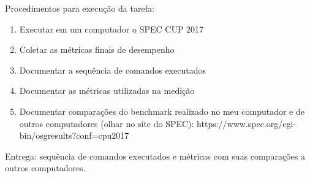 




Procedimentos para execução da tarefa:
\begin{enumerate}
    \item Executar em um computador o SPEC CUP 2017
    \item Coletar as métricas finais de desempenho
    \item Documentar a sequência de comandos executados
    \item Documentar as métricas utilizadas na medição 
    \item Documentar comparações do benchmark realizado no meu computador e de outros computadores (olhar no site do SPEC): https://www.spec.org/cgi-bin/osgresults?conf=cpu2017
\end{enumerate}


Entrega: sequência de comandos executados e métricas com suas comparações a outros computadores.

